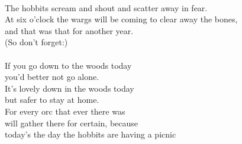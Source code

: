 \begin{multicols}{2}
\\
The hobbits scream and shout and scatter away in
fear.
\\
At six o’clock the wargs will be coming to clear away the bones,
\\
and that was that for another year.
\\
(So don’t forget:)
\\
\\
If you go down to the woods today
\\
you’d better not go alone.
\\
It’s lovely down in the woods today
\\
but safer to stay at home.
\\
For every orc that ever there was
\\
will gather there for certain, because
\\
today’s the day the hobbits are having a picnic
\end{multicols}